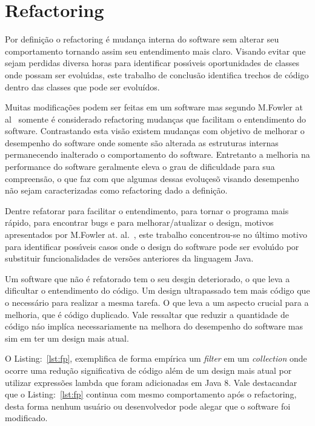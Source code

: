 \section{Refactoring}\label{sec:refactoring}

Por defini\c{c}\~{a}o o refactoring \'{e} mudan\c{c}a interna do software sem alterar seu comportamento tornando assim seu entendimento mais claro. Visando evitar que sejam perdidas diversa horas para identificar poss\'{\i}veis oportunidades de classes onde possam ser evolu\'{\i}das, este trabalho de conclus\~{a}o identifica trechos de c\'{o}digo dentro das classes que pode ser evolu\'{i}dos.

Muitas modifica\c{c}\~{o}es podem ser feitas em um software mas segundo M.Fowler at al~\cite{martinFowlerRafactoring} somente \'{e} considerado refactoring mudan\c{c}as que facilitam o entendimento do software. Contrastando esta vis\~{a}o existem mudan\c{c}as com objetivo de melhorar o desempenho do software onde somente s\~{a}o alterada as estruturas internas permanecendo inalterado o comportamento do software. Entretanto a melhoria na performance do software geralmente eleva o grau de dificuldade para sua compreens\~{a}o, o que faz com que algumas dessas evolu\c{c}es\~{o} visando desempenho n\~{a}o sejam caracterizadas como refactoring dado a defini\c{c}\~{a}o.

Dentre refatorar para facilitar o entendimento, para tornar o programa mais r\'{a}pido, para encontrar bugs e para melhorar/atualizar o design, motivos apresentados por M.Fowler at. al.~\cite{martinFowlerRafactoring}, este trabalho concentrou-se no \'{u}ltimo motivo para identificar poss\'{\i}veis casos onde o design do software pode ser evolu\'{\i}do por substituir funcionalidades de vers\~{o}es anteriores da linguagem Java.

Um software que n\~{a}o \'{e} refatorado tem o seu desgin deteriorado, o que leva a dificultar o entendimento do c\'{o}digo. Um design ultrapassado tem mais c\'{o}digo que o necess\'{a}rio para realizar a mesma tarefa. O que leva a um aspecto crucial para a melhoria, que \'{e} código duplicado. Vale ressaltar que reduzir a quantidade de c\'{o}digo n\'{a}o impl\'{i}ca necessariamente na melhora do desempenho do software mas sim em ter um design mais atual.

O Listing:~\ref{lst:fp}, exemplifica de forma emp\'{i}rica um {\it filter} em um {\it collection} onde ocorre uma redu\c{c}\~{a}o significativa de c\'{o}digo al\'{e}m de um design mais atual por utilizar express\~{o}es lambda que foram adicionadas em Java 8. Vale destacandar que o Listing:~\ref{lst:fp} continua com mesmo comportamento após o refactoring, desta forma nenhum usuário ou desenvolvedor pode alegar que o software foi modificado.


